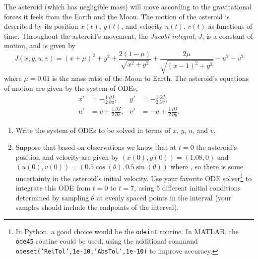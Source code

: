 \documentclass[11pt]{article}
\newcommand{\p}{\partial}
\begin{document}
\begin{enumerate}
    The asteroid (which has negligible mass) will move according to the
    gravitational forces it feels from the Earth and the Moon. The motion of
    the asteroid is described by its position $x(t)$, $y(t)$, and velocity
    $u(t)$, $v(t)$ as functions of time. Throughout the asteroid's movement,
    the \textit{Jacobi integral}, $J$, is a constant of motion, and is given
    by
    \begin{equation}
      J(x,y,u,v) = (x+\mu)^2 + y^2 + \frac{2(1-\mu)}{\sqrt{x^2+y^2}} +
      \frac{2\mu}{\sqrt{(x-1)^2+y^2}} - u^2 - v^2
    \end{equation}
    where $\mu=0.01$ is the mass ratio of the Moon to Earth.
    The asteroid's equations of motion are given by the system of ODEs,
    \begin{align}
      x' &= -\frac{1}{2}\frac{\p J}{\p u}, &y' &= -\frac{1}{2}\frac{\p J}{\p v}, \nonumber\\
      u' &= v +\frac{1}{2}\frac{\p J}{\p x},  &v' &= -u+\frac{1}{2}\frac{\p J}{\p y}.
    \end{align}
    \begin{enumerate}
      \item Write the system of ODEs to be solved in terms of $x$, $y$, $u$,
	and $v$.
      \item Suppose that based on observations we know that at $t=0$ the
	asteroid's position and velocity are given by $(x(0),y(0))=(1.08,0)$
	and $(u(0),v(0)) = (0.5\cos(\theta),0.5\sin(\theta))$ where
	, so there is some
	uncertainty in the asteroid's initial velocity. Use your favorite
	ODE solver\footnote{In Python, a good choice would be the \texttt{odeint} routine.
	In MATLAB, the \texttt{ode45} routine could be used, using the additional
	command \texttt{odeset('RelTol',1e-10,'AbsTol',1e-10)} to improve accuracy.}
	to integrate this ODE from $t=0$ to $t=7$, using 5 different
	initial conditions determined by sampling $\theta$ at evenly spaced
	points in the interval
	 (your samples should
	include the endpoints of the interval).


\end{enumerate}
\end{enumerate}
\end{document}
